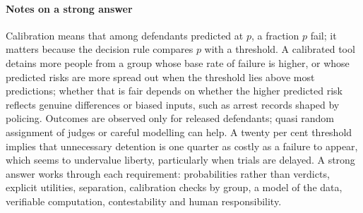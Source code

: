 \paragraph{Notes on a strong answer} Calibration means that among defendants predicted at $p$, a fraction $p$ fail; it matters because the decision rule compares $p$ with a threshold. A calibrated tool detains more people from a group whose base rate of failure is higher, or whose predicted risks are more spread out when the threshold lies above most predictions; whether that is fair depends on whether the higher predicted risk reflects genuine differences or biased inputs, such as arrest records shaped by policing. Outcomes are observed only for released defendants; quasi random assignment of judges or careful modelling can help. A twenty per cent threshold implies that unnecessary detention is one quarter as costly as a failure to appear, which seems to undervalue liberty, particularly when trials are delayed. A strong answer works through each requirement: probabilities rather than verdicts, explicit utilities, separation, calibration checks by group, a model of the data, verifiable computation, contestability and human responsibility.
